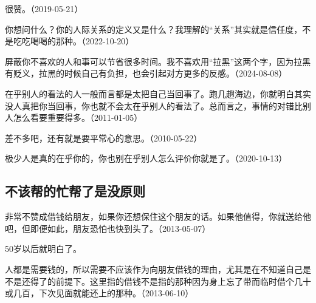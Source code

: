 
很赞。（2019-05-21）


你想问什么？你的人际关系的定义又是什么？我理解的“关系”其实就是信任度，不是吃吃喝喝的那种。（2022-10-20）


屏蔽你不喜欢的人和事可以节省很多时间。我不喜欢用“拉黑”这两个字，因为拉黑有贬义，拉黑的时候自己有负担，也会引起对方更多的反感。（2024-08-08）


在乎别人的看法的人一般而言都是太把自己当回事了。跑几趟海边，你就明白其实没人真把你当回事，你也就不会太在乎别人的看法了。总而言之，事情的对错比别人怎么看要重要得多。（2011-01-05）


差不多吧，还有就是要平常心的意思。（2010-05-22）


极少人是真的在乎你的，你也别在乎别人怎么评价你就是了。（2020-10-13）

\subsection{不该帮的忙帮了是没原则}


非常不赞成借钱给朋友，如果你还想保住这个朋友的话。如果他值得，你就送给他吧，但即便如此，朋友恐怕也快到头了。（2013-05-07）


50岁以后就明白了。

人都是需要钱的，所以需要不应该作为向朋友借钱的理由，尤其是在不知道自己是不是还得了的前提下。这里指的借钱不是指的那种因为身上忘了带而临时借个几十或几百，下次见面就能还上的那种。（2013-06-10）


